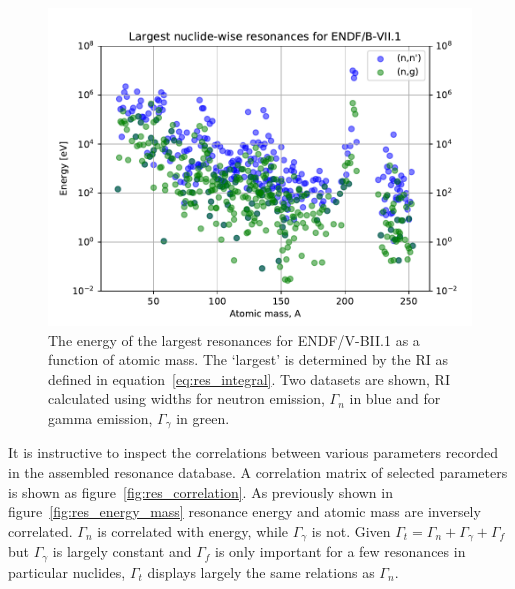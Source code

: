 \begin{figure}[H]
  \centering
  \includegraphics[width=\linewidth]{largest_res_energy_scatter}
  \caption{The energy of the largest resonances for ENDF/V-BII.1 as a function of atomic mass. The `largest' is determined by the RI as defined in equation~\ref{eq:res_integral}. Two datasets are shown, RI calculated using widths for neutron emission, $\Gamma_{n}$ in blue and for gamma emission, $\Gamma_{\gamma}$ in green.}
  \label{fig:largest_res_energy_scatter}
\end{figure}

It is instructive to inspect the correlations between various parameters recorded in the assembled resonance database. A correlation matrix of selected parameters is shown as figure~\ref{fig:res_correlation}. As previously shown in figure~\ref{fig:res_energy_mass} resonance energy and atomic mass are inversely correlated. $\Gamma_{n}$ is correlated with energy, while $\Gamma_{\gamma}$ is not. Given $\Gamma_{t} = \Gamma_{n} + \Gamma_{\gamma} + \Gamma_{f}$ but $\Gamma_{\gamma}$ is largely constant and $\Gamma_{f}$ is only important for a few resonances in particular nuclides, $\Gamma_{t}$ displays largely the same relations as $\Gamma_{n}$. 

